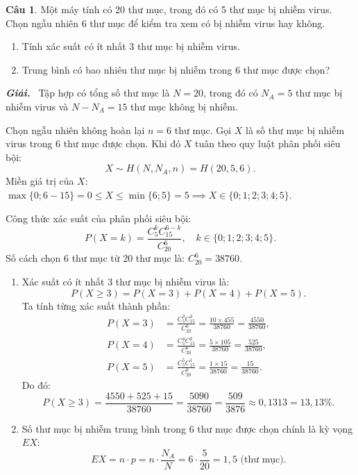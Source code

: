 \documentclass[12pt,a4paper]{article}
\theoremstyle{definition}
\newtheorem{cau}{Câu}
\newcommand{\giai}{\noindent\textbf{\textit{Giải.}}\ }
\begin{document}
\begin{cau}
Một máy tính có 20 thư mục, trong đó có 5 thư mục bị nhiễm virus. Chọn ngẫu nhiên 6 thư mục để kiểm tra xem có bị nhiễm virus hay không.
\begin{enumerate}[label=\alph*)]
    \item Tính xác suất có ít nhất 3 thư mục bị nhiễm virus.
    \item Trung bình có bao nhiêu thư mục bị nhiễm trong 6 thư mục được chọn?
\end{enumerate}
\end{cau}

\giai
Tập hợp có tổng số thư mục là $N = 20$, trong đó có $N_A = 5$ thư mục bị nhiễm virus và $N - N_A = 15$ thư mục không bị nhiễm.

Chọn ngẫu nhiên không hoàn lại $n = 6$ thư mục. Gọi $X$ là số thư mục bị nhiễm virus trong 6 thư mục được chọn. Khi đó $X$ tuân theo quy luật phân phối siêu bội:
\[
X \sim H(N, N_A, n) = H(20, 5, 6).
\]
Miền giá trị của $X$: $\max\{0; 6 - 15\} = 0 \le X \le \min\{6; 5\} = 5 \implies X \in \{0; 1; 2; 3; 4; 5\}$.

Công thức xác suất của phân phối siêu bội:
\[
P(X = k) = \frac{C_5^k C_{15}^{6-k}}{C_{20}^6}, \quad k \in \{0; 1; 2; 3; 4; 5\}.
\]
Số cách chọn 6 thư mục từ 20 thư mục là: $C_{20}^6 = 38760$.

\begin{enumerate}[label=\alph*)]
    \item Xác suất có ít nhất 3 thư mục bị nhiễm virus là:
    \[
    P(X \ge 3) = P(X = 3) + P(X = 4) + P(X = 5).
    \]
    Ta tính từng xác suất thành phần:
    \begin{align*}
    P(X = 3) &= \frac{C_5^3 C_{15}^3}{C_{20}^6} = \frac{10 \times 455}{38760} = \frac{4550}{38760}, \\
    P(X = 4) &= \frac{C_5^4 C_{15}^2}{C_{20}^6} = \frac{5 \times 105}{38760} = \frac{525}{38760}, \\
    P(X = 5) &= \frac{C_5^5 C_{15}^1}{C_{20}^6} = \frac{1 \times 15}{38760} = \frac{15}{38760}.
    \end{align*}
    Do đó:
    \[
    P(X \ge 3) = \frac{4550 + 525 + 15}{38760} = \frac{5090}{38760} = \frac{509}{3876} \approx 0{,}1313 = 13{,}13\%.
    \]

    \item Số thư mục bị nhiễm trung bình trong 6 thư mục được chọn chính là kỳ vọng $EX$:
    \[
    EX = n \cdot p = n \cdot \frac{N_A}{N} = 6 \cdot \frac{5}{20} = 1{,}5\text{ (thư mục)}.
    \]
\end{enumerate}
\end{document}
